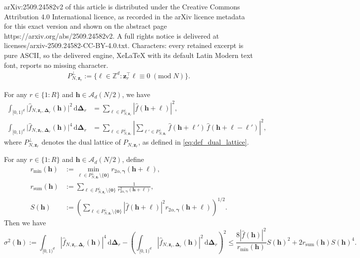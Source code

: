 \documentclass[10pt,a4paper]{amsart}
\newcommand{\ZZ}{\mathbb{Z}}
\newcommand{\bsDelta}{\boldsymbol{\Delta}}
\newcommand{\bsgamma}{\boldsymbol{\gamma}}
\newcommand{\bsh}{\boldsymbol{h}}
\newcommand{\bsl}{\boldsymbol{\ell}}
\newcommand{\bszero}{\boldsymbol{0}}
\newcommand{\bsz}{\boldsymbol{z}}
\newcommand{\rd}{\, \mathrm{d}}
\newcommand{\tmod}[1]{{\;(\mathrm{mod}\; #1)}}
\begin{document}
arXiv:2509.24582v2 of this article is distributed under the Creative Commons Attribution 4.0 International licence, as recorded in the arXiv licence metadata for this exact version and shown on the abstract page https://arxiv.org/abs/2509.24582v2. A full rights notice is delivered at licenses/arxiv-2509.24582-CC-BY-4.0.txt. Characters: every retained excerpt is pure ASCII, so the delivered engine, XeLaTeX with its default Latin Modern text font, reports no missing character.
\begin{align}\label{eq:def_dual_lattice}
P_{N,\bsz_r}^\perp := \{\bsl \in \ZZ^d : \bsz_r^\top \bsl \equiv 0 \tmod N\}.
\end{align}

\begin{lemma} 
For any $r\in\{1{:}R\}$ and $\bsh\in \mathcal{A}_d(N/2)$, we have
\begin{align}
    \int_{[0,1)^d} \bigl|\widehat{f}_{N,\bsz_r,\bsDelta_r}(\bsh)\bigr|^2 \,\mathrm{d}\bsDelta_r
    &= \sum_{\bsl \in P_{N,\boldsymbol{z}_r}^\perp} |\widehat{f}(\bsh+\bsl)|^2, \label{eqn:1stmoment} \\
    \int_{[0,1)^d} \bigl|\widehat{f}_{N,\bsz_r,\bsDelta_r}(\bsh)\bigr|^4 \,\mathrm{d}\bsDelta_r
    &= \sum_{\bsl \in P_{N,\boldsymbol{z}_r}^\perp} \left| \sum_{\bsl' \in P_{N,\boldsymbol{z}_r}^\perp} \widehat{f}(\bsh+\bsl') \, \widehat{f}(\bsh+\bsl-\bsl') \right|^2, \label{eqn:2ndmoment}
\end{align}
where $P_{N,\boldsymbol{z}_r}^\perp$ denotes the dual lattice of $P_{N,\boldsymbol{z}_r}$, as defined in \eqref{eq:def_dual_lattice}.
\end{lemma}

\begin{lemma}\label{lem:2ndmomentbound} 
For any $r\in\{1{:}R\}$ and $\bsh\in \mathcal{A}_d(N/2)$, define
\begin{align*}
    r_{\min}(\bsh) & :=\min_{\bsl\in P_{N,\boldsymbol{z}_r}^\perp\setminus \{\bszero\}}r_{2\alpha, \bsgamma}(\bsh+\bsl),\\
    r_{\mathrm{sum}}(\bsh) & :=\sum_{\bsl\in P_{N,\boldsymbol{z}_r}^\perp\setminus \{\bszero\}} \frac{1}{r^2_{2\alpha, \bsgamma}(\bsh+\bsl)},\\
    S(\bsh) & :=\left(\sum_{\bsl\in P_{N,\boldsymbol{z}_r}^\perp\setminus \{\bszero\} }|\widehat{f}(\bsh+\bsl)|^2r_{2\alpha, \bsgamma}(\bsh+\bsl)\right)^{1/2}.
\end{align*}
Then we have
\[ 
    \sigma^2(\bsh):=\int_{[0,1)^d} |\widehat{f}_{N,\bsz_r,\bsDelta_r}(\bsh)|^4\rd\bsDelta_r-\left(\int_{[0,1)^d} |\widehat{f}_{N,\bsz_r,\bsDelta_r}(\bsh)|^2\rd\bsDelta_r\right)^2 \leq  \frac{8|\widehat{f}(\bsh)|^2}{r_{\min}(\bsh)}S(\bsh)^2+2r_{\mathrm{sum}}(\bsh)S(\bsh)^4.
\]
\end{lemma}
\end{document}
